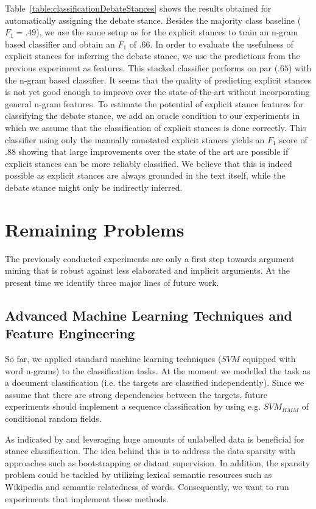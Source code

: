 \documentclass[11pt]{article}
\begin{document}
Table~\ref{table:classificationDebateStances} shows the results obtained for automatically assigning the debate stance.
Besides the majority class baseline ($F_1=.49$), we use the same setup as for the explicit stances to train an n-gram based classifier and obtain an $F_1$ of $.66$.
In order to evaluate the usefulness of explicit stances for inferring the debate stance, we use the predictions from the previous experiment as features.
This stacked classifier performs on par ($.65$) with the n-gram based classifier.
It seems that the quality of predicting explicit stances is not yet good enough to improve over the state-of-the-art without incorporating general n-gram features.
To estimate the potential of explicit stance features for classifying the debate stance, we add an oracle condition to our experiments in which we assume that the classification of explicit stances is done correctly.
This classifier using only the manually annotated explicit stances yields an $F_1$ score of $.88$ showing that large improvements over the state of the art are possible if explicit stances can be more reliably classified.
We believe that this is indeed possible as explicit stances are always grounded in the text itself, while the debate stance might only be indirectly inferred.


\section{Remaining Problems}
The previously conducted experiments are only a first step towards argument mining that is robust against less elaborated and implicit arguments.
At the present time we identify three major lines of future work.  

\subsection{Advanced Machine Learning Techniques and Feature Engineering}
So far, we applied standard machine learning techniques ($SVM$ equipped with word n-grams) to the classification tasks.
At the moment we modelled the task as a document classification (i.e. the targets are classified independently).
Since we assume that there are strong dependencies between the targets, future experiments should implement a sequence classification by using e.g. $SVM_{HMM}$ of conditional random fields. 

As indicated by  and  leveraging huge amounts of unlabelled data is beneficial for stance classification.
The idea behind this is to address the data sparsity with approaches such as bootstrapping or distant supervision.
In addition, the sparsity problem could be tackled by utilizing lexical semantic resources such as Wikipedia and semantic relatedness of words.
Consequently, we want to run experiments that implement these methods.
\end{document}
